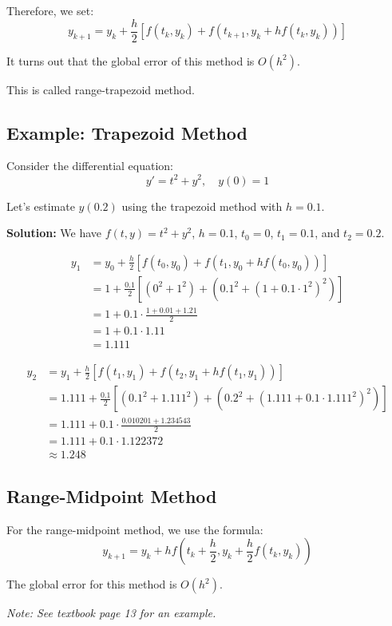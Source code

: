 \documentclass{article}
\begin{document}
Therefore, we set:
\[
y_{k+1} = y_k + \frac{h}{2}[f(t_k, y_k) + f(t_{k+1}, y_k + hf(t_k, y_k))]
\]

It turns out that the global error of this method is $O(h^2)$.

This is called range-trapezoid method.


\subsection*{Example: Trapezoid Method}

Consider the differential equation:
\[
y' = t^2 + y^2, \quad y(0) = 1
\]

Let's estimate $y(0.2)$ using the trapezoid method with $h = 0.1$.

\textbf{Solution:} 
We have $f(t, y) = t^2 + y^2$, $h = 0.1$, $t_0 = 0$, $t_1 = 0.1$, and $t_2 = 0.2$.

\begin{align*}
y_1 &= y_0 + \frac{h}{2}[f(t_0, y_0) + f(t_1, y_0 + hf(t_0, y_0))] \\
&= 1 + \frac{0.1}{2}[(0^2 + 1^2) + (0.1^2 + (1 + 0.1 \cdot 1^2)^2)] \\
&= 1 + 0.1 \cdot \frac{1 + 0.01 + 1.21}{2} \\
&= 1 + 0.1 \cdot 1.11 \\
&= 1.111
\end{align*}

\begin{align*}
y_2 &= y_1 + \frac{h}{2}[f(t_1, y_1) + f(t_2, y_1 + hf(t_1, y_1))] \\
&= 1.111 + \frac{0.1}{2}[(0.1^2 + 1.111^2) + (0.2^2 + (1.111 + 0.1 \cdot 1.111^2)^2)] \\
&= 1.111 + 0.1 \cdot \frac{0.010201 + 1.234543}{2} \\
&= 1.111 + 0.1 \cdot 1.122372 \\
&\approx 1.248
\end{align*}

\subsection*{Range-Midpoint Method}

For the range-midpoint method, we use the formula:
\[
y_{k+1} = y_k + hf\left(t_k + \frac{h}{2}, y_k + \frac{h}{2}f(t_k, y_k)\right)
\]

The global error for this method is $O(h^2)$.

\textit{Note: See textbook page 13 for an example.}
\end{document}
